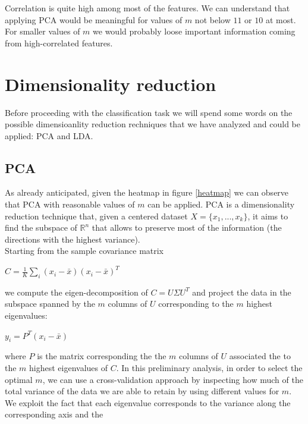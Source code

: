 \documentclass[10pt, a4paper, twocolumn]{article} %
\begin{document}
Correlation is quite high among most of the features. We can understand that applying PCA
would be meaningful for values of $m$ not below $11$ or $10$ at most. For smaller values of $m$
we would probably loose important information coming from high-correlated features. 
\section{Dimensionality reduction}
Before proceeding with the classification task we will spend some words on the possible 
dimensioanlity reduction rechniques that we have analyzed and could be applied: PCA and LDA.
\subsection{PCA}
As already anticipated, given the heatmap in figure \ref{heatmap} we can observe that PCA
with reasonable values of $m$ can be applied. 
PCA is a dimensionality reduction technique that, given a centered dataset $X = \{x_{1}, ..., x_{k}\}$, it aims to find the subspace of 
$\mathbb{R}^{n}$ that allows to preserve most of the information (the directions with the
highest variance).\\Starting from the sample covariance matrix
\begin{center}
	\begin{math}
		C = \frac{1}{K} \sum_{i}^{}(x_{i} - \bar{x})(x_{i}-\bar{x})^T
	\end{math}
\end{center}
we compute the eigen-decomposition of $C = U\Sigma U^T$ and project the data in the subspace
spanned by the $m$ columns of $U$ corresponding to the $m$ highest eigenvalues:
\begin{center}
	\begin{math}
		y_{i} = P^T(x_{i}-\bar{x})
	\end{math}
\end{center}
where $P$ is the matrix corresponding the the $m$ columns of $U$ associated the to
the $m$ highest eigenvalues of $C$.
In this preliminary analysis, in order to select the optimal $m$, we can use a cross-validation approach by inspecting how much
of the total variance of the data we are able to retain by using different values for $m$. We exploit the fact
that each eigenvalue corresponds to the variance along the corresponding axis and the
\end{document}
